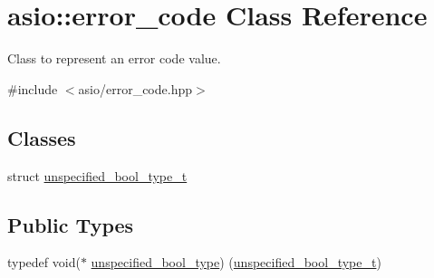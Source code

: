\hypertarget{classasio_1_1error__code}{}\section{asio\+:\+:error\+\_\+code Class Reference}
\label{classasio_1_1error__code}


Class to represent an error code value.  




{\ttfamily \#include $<$asio/error\+\_\+code.\+hpp$>$}

\subsection*{Classes}
\begin{DoxyCompactItemize}
\item 
struct \hyperlink{structasio_1_1error__code_1_1unspecified__bool__type__t}{unspecified\+\_\+bool\+\_\+type\+\_\+t}
\end{DoxyCompactItemize}
\subsection*{Public Types}
\begin{DoxyCompactItemize}
\item 
typedef void($\ast$ \hyperlink{classasio_1_1error__code_a353c53ec77b09ea93ff7cf52cfaedd12}{unspecified\+\_\+bool\+\_\+type}) (\hyperlink{structasio_1_1error__code_1_1unspecified__bool__type__t}{unspecified\+\_\+bool\+\_\+type\+\_\+t})
\end{DoxyCompactItemize}
